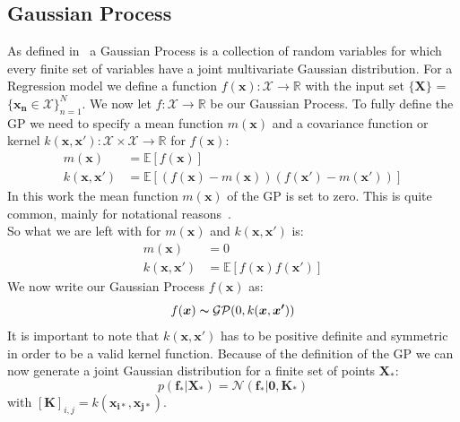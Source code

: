 \documentclass{article}
\begin{document}
\subsection{Gaussian Process} %
As defined in~\cite{RasmussenCarlEdward} a Gaussian Process is a collection of
random variables for which every finite set of variables have a joint
multivariate Gaussian distribution. For a Regression model we define a function
$f(\bm{x}): \mathcal{X}\rightarrow \mathbb{R}$ with the input set $\{\bm{X}\}$
= $\{\bm{x_n} \in \mathcal{X} \}_{n=1}^N$. We now let $f:
    \mathcal{X}\rightarrow \mathbb{R}$ be our Gaussian Process. To fully define the
GP we need to specify a mean function $m(\bm{x})$ and a covariance function or
kernel $k(\bm{x}, \bm{x'}): \mathcal{X} \times \mathcal{X} \rightarrow
    \mathbb{R}$ for $f(\bm{x})$:
\begin{equation}
    \begin{aligned}
        m(\bm{x})         & = \mathbb{E}[f(\bm{x})]                                    \\
        k(\bm{x},\bm{x'}) & = \mathbb{E}[(f(\bm{x})-m(\bm{x}))(f(\bm{x'})-m(\bm{x'}))]
    \end{aligned}
\end{equation}
In this work the mean function $m(\bm{x})$ of the GP is set to zero. This is quite common, mainly for notational reasons~\cite{RasmussenCarlEdward}.\\
So what we are left with for  $m(\bm{x})$ and $ k(\bm{x},\bm{x'})$ is:
\begin{equation}
    \begin{aligned}
        m(\bm{x})         & = 0                               \\
        k(\bm{x},\bm{x'}) & = \mathbb{E}[f(\bm{x})f(\bm{x'})]
    \end{aligned}
\end{equation}
We now write our Gaussian Process $f(\bm{x})$ as:
\begin{equation}
    f(\bm{x})\thicksim \mathcal{G} \mathcal{P}(0,k(\bm{x},\bm{x'}))
\end{equation}
It is important to note that $ k(\bm{x},\bm{x'})$ has to be positive definite and symmetric in order to be a valid kernel function.
Because of the definition of the GP we can now generate a joint Gaussian distribution for a finite set of points $\bm{X_*}$:
\begin{equation}
    \label{eq:f_star_random_vector}
    p(\bm{f_*|\bm{X_*}}) = \mathcal{N}(\bm{f_*}|\bm{0},\bm{K_*})
\end{equation}
with ${[\bm{K}]}_{i,j} = k(\bm{x_{i*}},\bm{x_{j*}})$.
\end{document}
